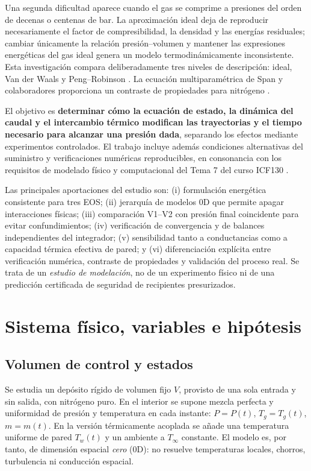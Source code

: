 \documentclass[11pt,letterpaper]{article}
\begin{document}
Una segunda dificultad aparece cuando el gas se comprime a presiones del orden de decenas o centenas de bar. La aproximación ideal deja de reproducir necesariamente el factor de compresibilidad, la densidad y las energías residuales; cambiar únicamente la relación presión--volumen y mantener las expresiones energéticas del gas ideal genera un modelo termodinámicamente inconsistente. Esta investigación compara deliberadamente tres niveles de descripción: ideal, Van der Waals y Peng--Robinson \citep{Peng1976}. La ecuación multiparamétrica de Span y colaboradores proporciona un contraste de propiedades para nitrógeno \citep{Span2000}.

El objetivo es \textbf{determinar cómo la ecuación de estado, la dinámica del caudal y el intercambio térmico modifican las trayectorias y el tiempo necesario para alcanzar una presión dada}, separando los efectos mediante experimentos controlados. El trabajo incluye además condiciones alternativas del suministro y verificaciones numéricas reproducibles, en consonancia con los requisitos de modelado físico y computacional del Tema 7 del curso ICF130 \citep{ICF130}.

Las principales aportaciones del estudio son: (i) formulación energética consistente para tres EOS; (ii) jerarquía de modelos 0D que permite apagar interacciones físicas; (iii) comparación V1--V2 con presión final coincidente para evitar confundimientos; (iv) verificación de convergencia y de balances independientes del integrador; (v) sensibilidad tanto a conductancias como a capacidad térmica efectiva de pared; y (vi) diferenciación explícita entre verificación numérica, contraste de propiedades y validación del proceso real. Se trata de un \textit{estudio de modelación}, no de un experimento físico ni de una predicción certificada de seguridad de recipientes presurizados.

\section{Sistema físico, variables e hipótesis}
\subsection{Volumen de control y estados}
Se estudia un depósito rígido de volumen fijo $V$, provisto de una sola entrada y sin salida, con nitrógeno puro. En el interior se supone mezcla perfecta y uniformidad de presión y temperatura en cada instante: $P=P(t)$, $T_g=T_g(t)$, $m=m(t)$. En la versión térmicamente acoplada se añade una temperatura uniforme de pared $T_w(t)$ y un ambiente a $T_\infty$ constante. El modelo es, por tanto, de dimensión espacial \emph{cero} (0D): no resuelve temperaturas locales, chorros, turbulencia ni conducción espacial.
\end{document}

